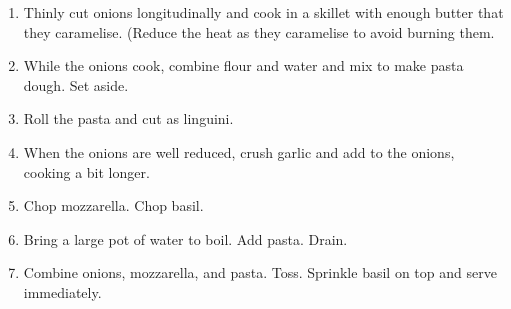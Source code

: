 
\begin{ingredients}
  \bigskip
  \bigskip
\end{ingredients}


\begin{recipe}
  \begin{enumerate}

  \item Thinly cut onions longitudinally and cook in a skillet with
    enough butter that they caramelise.  (Reduce the heat as they
    caramelise to avoid burning them.

  \item While the onions cook, combine flour and water and mix to make
    pasta dough.  Set aside.

  \item Roll the pasta and cut as linguini.

  \item When the onions are well reduced, crush garlic and add to the
    onions, cooking a bit longer.

  \item Chop mozzarella.  Chop basil.

  \item Bring a large pot of water to boil.  Add pasta.  Drain.

  \item Combine onions, mozzarella, and pasta.  Toss.  Sprinkle basil
    on top and serve immediately.
    
  \end{enumerate}
\end{recipe}

